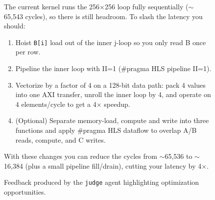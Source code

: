 \documentclass{article}
\begin{document}
\begin{figure}[tbp]
  \centering
  \begin{minipage}{0.98\columnwidth}
  \begin{tcolorbox}[colback=gray!4,colframe=black!30,boxrule=0.4pt,sharp corners]
  \footnotesize
The current kernel runs the 256$\times$256 loop fully sequentially ($\sim$65{,}543 cycles), so there is still headroom. To slash the latency you should:
\begin{enumerate}\itemsep2pt
  \item Hoist \texttt{B[i]} load out of the inner j-loop so you only read B once per row.
  \item Pipeline the inner loop with II=1 (\#pragma HLS pipeline II=1).
  \item Vectorize by a factor of 4 on a 128-bit data path: pack 4 values into one AXI transfer, unroll the inner loop by 4, and operate on 4 elements/cycle to get a 4$\times$ speedup.
  \item (Optional) Separate memory-load, compute and write into three functions and apply \#pragma HLS dataflow to overlap A/B reads, compute, and C writes.
\end{enumerate}
With these changes you can reduce the cycles from $\sim$65{,}536 to $\sim$16{,}384 (plus a small pipeline fill/drain), cutting your latency by 4$\times$.
  \end{tcolorbox}
  \end{minipage}
  \caption{Feedback produced by the \texttt{judge} agent highlighting optimization opportunities.}
  \label{fig:ex-judge1}
\end{figure}
\end{document}
